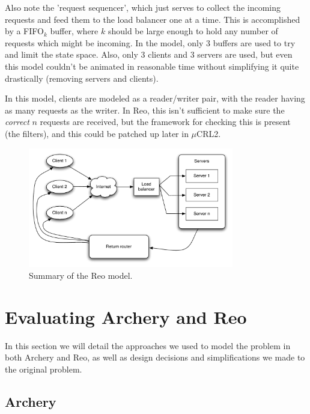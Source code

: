 \documentclass[a4paper]{article}
\newcommand{\ar}{Archery\xspace}
\newcommand{\re}{Reo\xspace}
\newcommand{\mcrl}{$\mu$CRL2\xspace}
\begin{document}
Also note the 'request sequencer', which just serves to collect the incoming
requests and feed them to the load balancer one at a time. This is accomplished
by a FIFO$_k$ buffer, where $k$ should be large enough to hold any number of
requests which might be incoming. In the model, only 3 buffers are used to try
and limit the state space. Also, only 3 clients and 3 servers are used, but even
this model couldn't be animated in reasonable time without simplifying it quite
drastically (removing servers and clients). 

In this model, clients are modeled as a reader/writer pair, with the reader
having as many requests as the writer. In \re, this isn't sufficient to make
sure the \emph{correct} $n$ requests are received, but the framework for
checking this is present (the filters), and this could be patched up later in
\mcrl.

\begin{figure}[h]
    \begin{center}
        \includegraphics[width=0.8\textwidth]{images/reo-model.pdf}
    \end{center}
    \caption{Summary of the \re model.}
    \label{fig:reo}
\end{figure}

%
%
\section{Evaluating \ar and \re}

In this section we will detail the approaches we used to model the problem in
both \ar and \re, as well as design decisions and simplifications we made to the
original problem.



\subsection{\ar}
\end{document}
